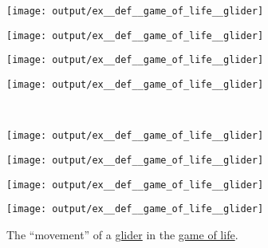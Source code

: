 \begin{example}
\begin{thmenum}
    \begin{figure}[!ht]
      \begin{subcaptionblock}{0.20\textwidth}
        \centering
        \texttt{[image: output/ex\_\_def\_\_game\_of\_life\_\_glider]}
        \caption{\( t = 0 \)}\label{fig:ex:def:game_of_life/glider/0}
      \end{subcaptionblock}
      \hfill
      \begin{subcaptionblock}{0.20\textwidth}
        \centering
        \texttt{[image: output/ex\_\_def\_\_game\_of\_life\_\_glider]}
        \caption{\( t = 1 \)}\label{fig:ex:def:game_of_life/glider/1}
      \end{subcaptionblock}
      \hfill
      \begin{subcaptionblock}{0.20\textwidth}
        \centering
        \texttt{[image: output/ex\_\_def\_\_game\_of\_life\_\_glider]}
        \caption{\( t = 2 \)}\label{fig:ex:def:game_of_life/glider/2}
      \end{subcaptionblock}
      \hfill
      \begin{subcaptionblock}{0.20\textwidth}
        \centering
        \texttt{[image: output/ex\_\_def\_\_game\_of\_life\_\_glider]}
        \caption{\( t = 3 \)}\label{fig:ex:def:game_of_life/glider/3}
      \end{subcaptionblock}
      \\[\baselineskip]
      \begin{subcaptionblock}{0.20\textwidth}
        \centering
        \texttt{[image: output/ex\_\_def\_\_game\_of\_life\_\_glider]}
        \caption{\( t = 4 \)}\label{fig:ex:def:game_of_life/glider/4}
      \end{subcaptionblock}
      \hfill
      \begin{subcaptionblock}{0.20\textwidth}
        \centering
        \texttt{[image: output/ex\_\_def\_\_game\_of\_life\_\_glider]}
        \caption{\( t = 5 \)}\label{fig:ex:def:game_of_life/glider/5}
      \end{subcaptionblock}
      \hfill
      \begin{subcaptionblock}{0.20\textwidth}
        \centering
        \texttt{[image: output/ex\_\_def\_\_game\_of\_life\_\_glider]}
        \caption{\( t = 6 \)}\label{fig:ex:def:game_of_life/glider/6}
      \end{subcaptionblock}
      \hfill
      \begin{subcaptionblock}{0.20\textwidth}
        \centering
        \texttt{[image: output/ex\_\_def\_\_game\_of\_life\_\_glider]}
        \caption{\( t = 7 \)}\label{fig:ex:def:game_of_life/glider/7}
      \end{subcaptionblock}
      \caption{The \enquote{movement} of a \hyperref[ex:def:game_of_life/glider]{glider} in the \hyperref[def:game_of_life]{game of life}.}\label{fig:ex:def:game_of_life/glider}
    \end{figure}
  \end{thmenum}
\end{example}

